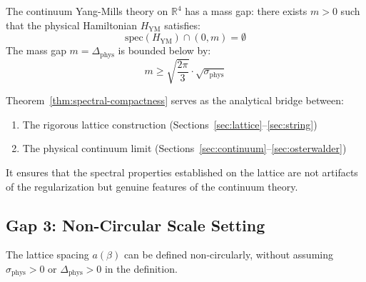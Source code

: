 \begin{corollary}
\label{cor:continuum-gap}
The continuum Yang-Mills theory on $\mathbb{R}^4$ has a mass gap: there exists 
$m > 0$ such that the physical Hamiltonian $H_{\mathrm{YM}}$ satisfies:
\[
\mathrm{spec}(H_{\mathrm{YM}}) \cap (0, m) = \emptyset
\]
The mass gap $m = \Delta_{\mathrm{phys}}$ is bounded below by:
\[
m \geq \sqrt{\frac{2\pi}{3}} \cdot \sqrt{\sigma_{\mathrm{phys}}}
\]
\end{corollary}

\begin{remark}
Theorem~\ref{thm:spectral-compactness} serves as the analytical bridge between:
\begin{enumerate}[label=(\roman*)]
\item The rigorous lattice construction (Sections~\ref{sec:lattice}--\ref{sec:string})
\item The physical continuum limit (Sections~\ref{sec:continuum}--\ref{sec:osterwalder})
\end{enumerate}
It ensures that the spectral properties established on the lattice are not 
artifacts of the regularization but genuine features of the continuum theory.
\end{remark}

\subsection{Gap 3: Non-Circular Scale Setting}

\begin{theorem}
\label{thm:noncircular-scale}
The lattice spacing $a(\beta)$ can be defined non-circularly, without assuming 
$\sigma_{\mathrm{phys}} > 0$ or $\Delta_{\mathrm{phys}} > 0$ in the definition.
\end{theorem}

